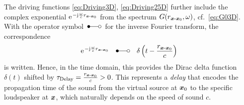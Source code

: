 The driving functions \eqref{eq:Driving3D}, \eqref{eq:Driving25D} further
include the complex exponential
$\e^{-\im\wc r_{\xs\text{-}\xp}}$ from the spectrum
$G(r_{\bm{x}\text{-}\bm{x}_\mathrm{0}},\omega)$, cf.~\myeq\eqref{eq:G03D}.
With the operator symbol $\,\Laplace\,$ for the inverse Fourier transform,
the correspondence
\begin{align}
\e^{-\im\wc r_{\xs\text{-}\xp}}
\quad\Laplace\quad
\delta\left(t-\frac{r_{\xs\text{-}\xp}}{c}\right)
\end{align}
is written.
%
Hence, in the time domain, this provides the Dirac delta function
$\delta(t)$ shifted by $\tau_\text{Delay}=\frac{r_{\bm{x}\text{-}\bm{x}_\mathrm{0}}}{c}>0$.
%
This represents a \textit{delay} that encodes the propagation time of the sound
from the virtual source at $\bm{x}_\mathrm{0}$ to the specific loudspeaker at $\bm{x}$, which
naturally depends on the speed of sound $c$.



